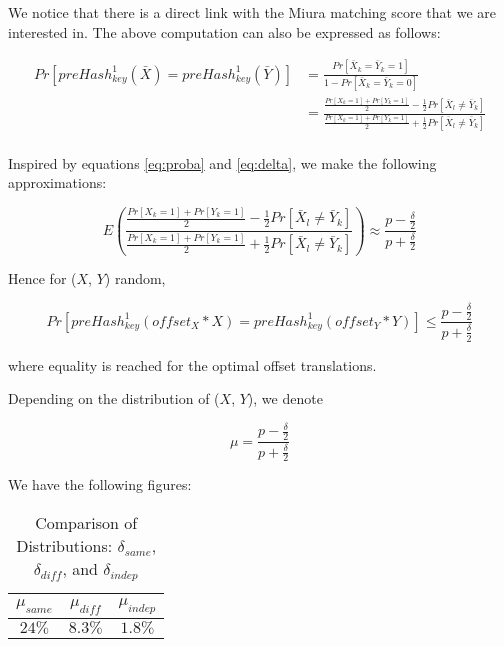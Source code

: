 We notice that there is a direct link with the Miura matching score that we are interested in. The above computation can also be expressed as follows:

\begin{equation} \label{eq:preHash2}
    \begin{aligned}
        Pr[preHash_{key}^1(\bar{X}) = preHash_{key}^1(\bar{Y})] &= \frac{Pr[\bar{X}_k = \bar{Y}_k = 1]}{1 - Pr[\bar{X}_k = \bar{Y}_k = 0]}\\
        &= \frac{\frac{Pr[X_k = 1] + Pr[Y_k = 1]}{2} - \frac{1}{2}Pr[\bar{X}_l \neq \bar{Y}_k]}{\frac{Pr[X_k = 1] + Pr[Y_k = 1]}{2} + \frac{1}{2}Pr[\bar{X}_l \neq \bar{Y}_k]}\\
    \end{aligned}
\end{equation}


Inspired by equations \ref{eq:proba} and \ref{eq:delta}, we make the following approximations:

\begin{equation}
    E\left(\frac{\frac{Pr[X_k = 1] + Pr[Y_k = 1]}{2} - \frac{1}{2}Pr[\bar{X}_l \neq \bar{Y}_k]}{\frac{Pr[X_k = 1] + Pr[Y_k = 1]}{2} + \frac{1}{2}Pr[\bar{X}_l \neq \bar{Y}_k]}\right) \approx \frac{p - \frac{\delta}{2}}{p + \frac{\delta}{2}}
\end{equation}

Hence for (\(X\), \(Y\)) random,

\begin{equation}
    Pr[preHash_{key}^1(offset_X * X) = preHash_{key}^1(offset_Y * Y)] \leq \frac{p - \frac{\delta}{2}}{p + \frac{\delta}{2}}
\end{equation}

where equality is reached for the optimal offset translations. 

Depending on the distribution of (\(X\), \(Y\)), we denote

\begin{equation} \label{eq:mu}
    \mu = \frac{p - \frac{\delta}{2}}{p + \frac{\delta}{2}}
\end{equation}

We have the following figures:

\begin{table}[H]
    \centering
    \renewcommand{\arraystretch}{1.25}\begin{tabular}{|c|c|c|}
        \hline
        $\mu_{same}$ & $\mu_{diff}$ & $\mu_{indep}$\\
        \hline
        $24\%$ & $8.3\%$ & $1.8\%$\\
        \hline
    \end{tabular}
\caption{Comparison of Distributions: $\delta_{same}$, $\delta_{diff}$, and $\delta_{indep}$}
\end{table}

